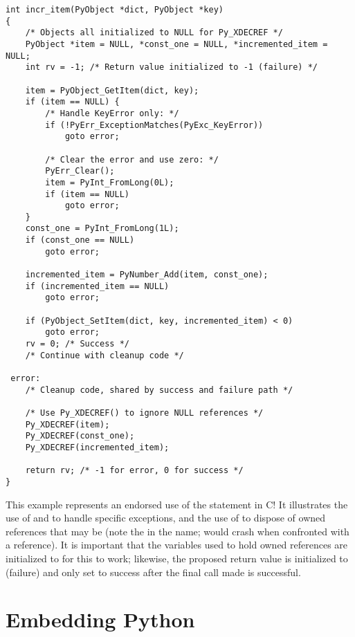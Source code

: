 \documentclass{manual}
\begin{document}
\begin{verbatim}
int incr_item(PyObject *dict, PyObject *key)
{
    /* Objects all initialized to NULL for Py_XDECREF */
    PyObject *item = NULL, *const_one = NULL, *incremented_item = NULL;
    int rv = -1; /* Return value initialized to -1 (failure) */

    item = PyObject_GetItem(dict, key);
    if (item == NULL) {
        /* Handle KeyError only: */
        if (!PyErr_ExceptionMatches(PyExc_KeyError))
            goto error;

        /* Clear the error and use zero: */
        PyErr_Clear();
        item = PyInt_FromLong(0L);
        if (item == NULL)
            goto error;
    }
    const_one = PyInt_FromLong(1L);
    if (const_one == NULL)
        goto error;

    incremented_item = PyNumber_Add(item, const_one);
    if (incremented_item == NULL)
        goto error;

    if (PyObject_SetItem(dict, key, incremented_item) < 0)
        goto error;
    rv = 0; /* Success */
    /* Continue with cleanup code */

 error:
    /* Cleanup code, shared by success and failure path */

    /* Use Py_XDECREF() to ignore NULL references */
    Py_XDECREF(item);
    Py_XDECREF(const_one);
    Py_XDECREF(incremented_item);

    return rv; /* -1 for error, 0 for success */
}
\end{verbatim}

This example represents an endorsed use of the  statement 
in C!  It illustrates the use of
 and
 to
handle specific exceptions, and the use of
 to
dispose of owned references that may be \NULL{} (note the
 in the name;  would crash when
confronted with a \NULL{} reference).  It is important that the
variables used to hold owned references are initialized to \NULL{} for
this to work; likewise, the proposed return value is initialized to
 (failure) and only set to success after the final call made
is successful.


\section{Embedding Python \label{embedding}}
\end{document}
